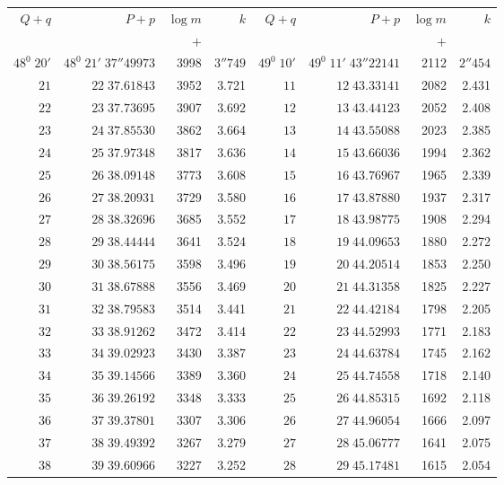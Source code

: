 \clearpage
{}
\begingroup
\fontsize{8}{9}\selectfont
\setlength{\tabcolsep}{3pt}
\renewcommand{\arraystretch}{1.08}
\begin{center}
\begin{tabular}{|r|r|r|r||r|r|r|r|}
\hline
\(Q+q\)&\(P+p\)&\(\log m\)&\(k\)&\(Q+q\)&\(P+p\)&\(\log m\)&\(k\)\\
&&\(+\)&&&&\(+\)&\\\hline
\(48^0\;20'\)&\(48^0\;21'\;37''49973\)&3998&\(3''749\)&\(49^0\;10'\)&\(49^0\;11'\;43''22141\)&2112&\(2''454\)\\
\(21\)&\(22\;37.61843\)&3952&3.721&\(11\)&\(12\;43.33141\)&2082&2.431\\
\(22\)&\(23\;37.73695\)&3907&3.692&\(12\)&\(13\;43.44123\)&2052&2.408\\
\(23\)&\(24\;37.85530\)&3862&3.664&\(13\)&\(14\;43.55088\)&2023&2.385\\
\(24\)&\(25\;37.97348\)&3817&3.636&\(14\)&\(15\;43.66036\)&1994&2.362\\
\(25\)&\(26\;38.09148\)&3773&3.608&\(15\)&\(16\;43.76967\)&1965&2.339\\
\(26\)&\(27\;38.20931\)&3729&3.580&\(16\)&\(17\;43.87880\)&1937&2.317\\
\(27\)&\(28\;38.32696\)&3685&3.552&\(17\)&\(18\;43.98775\)&1908&2.294\\
\(28\)&\(29\;38.44444\)&3641&3.524&\(18\)&\(19\;44.09653\)&1880&2.272\\
\(29\)&\(30\;38.56175\)&3598&3.496&\(19\)&\(20\;44.20514\)&1853&2.250\\[3pt]
\(30\)&\(31\;38.67888\)&3556&3.469&\(20\)&\(21\;44.31358\)&1825&2.227\\
\(31\)&\(32\;38.79583\)&3514&3.441&\(21\)&\(22\;44.42184\)&1798&2.205\\
\(32\)&\(33\;38.91262\)&3472&3.414&\(22\)&\(23\;44.52993\)&1771&2.183\\
\(33\)&\(34\;39.02923\)&3430&3.387&\(23\)&\(24\;44.63784\)&1745&2.162\\
\(34\)&\(35\;39.14566\)&3389&3.360&\(24\)&\(25\;44.74558\)&1718&2.140\\
\(35\)&\(36\;39.26192\)&3348&3.333&\(25\)&\(26\;44.85315\)&1692&2.118\\
\(36\)&\(37\;39.37801\)&3307&3.306&\(26\)&\(27\;44.96054\)&1666&2.097\\
\(37\)&\(38\;39.49392\)&3267&3.279&\(27\)&\(28\;45.06777\)&1641&2.075\\
\(38\)&\(39\;39.60966\)&3227&3.252&\(28\)&\(29\;45.17481\)&1615&2.054\\

\end{tabular}
\end{center}
